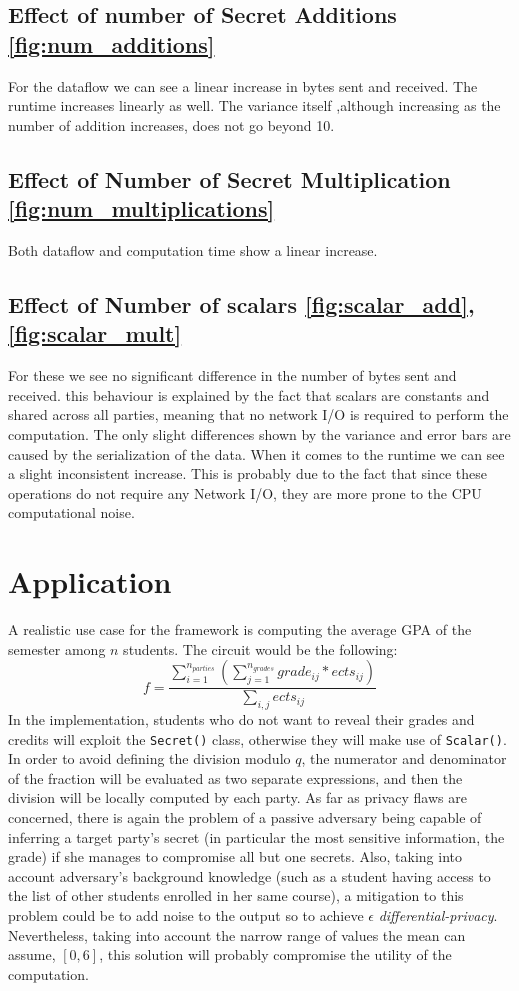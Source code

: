 \documentclass[10pt,conference,compsocconf]{IEEEtran}
\begin{document}
\subsection{Effect of number of Secret Additions \ref{fig:num_additions}}

For the dataflow we can see a linear increase in bytes sent and received.
The runtime increases linearly as well.
The variance itself ,although increasing as the number of addition increases, does not go beyond 10.

\subsection{Effect of Number of Secret Multiplication \ref{fig:num_multiplications}}
Both dataflow and computation time show a linear increase.

\subsection{Effect of Number of scalars \ref{fig:scalar_add},\ref{fig:scalar_mult}}
For these we see no significant difference in the number of bytes sent and received.
this behaviour is explained by the fact that scalars are constants and shared across all parties, meaning that no network
I/O is required to perform the computation.
The only slight differences shown by the variance and error bars are caused by the serialization of the data.
When it comes to the runtime we can see a slight inconsistent increase.
This is probably due to the fact that since these operations do not require any Network I/O, they are more
prone to the CPU computational noise.

\section{Application}
A realistic use case for the framework is computing the average GPA of the semester among $n$ students. The circuit would be the following:
\[f = \frac{\sum_{i=1}^{n_{parties}}(\sum_{j=1}^{n_{grades}}grade_{ij}*ects_{ij})}{\sum_{i,j}ects_{ij}}\]
In the implementation, students who do not want to reveal their grades and credits will exploit the \texttt{Secret()} class, otherwise they will make use of \texttt{Scalar()}.
In order to avoid defining the division modulo $q$, the numerator and denominator of the fraction will be evaluated as two separate expressions, and then the division will be locally computed by each party.
As far as privacy flaws are concerned, there is again the problem of a passive adversary being capable of inferring a target party's secret (in particular the most sensitive information, the grade) if she manages to compromise all but one secrets.
Also, taking into account adversary's background knowledge (such as a student having access to the list of other students enrolled in her same course), a mitigation to this problem could be to add noise to the output so to achieve $\epsilon$ \textit{differential-privacy}. Nevertheless, taking into account the narrow range of values the mean can assume, $[0,6]$, this solution will probably compromise the utility of the computation.  


\end{document}

